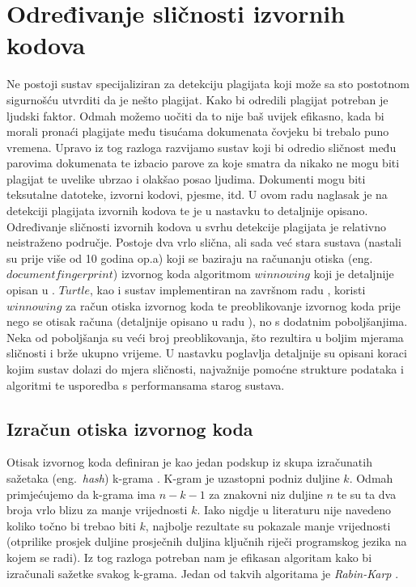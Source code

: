 \chapter{Određivanje sličnosti izvornih kodova}

Ne postoji sustav specijaliziran za detekciju plagijata koji može sa sto postotnom sigurnošću utvrditi da je nešto plagijat. Kako bi odredili plagijat potreban je ljudski faktor.  Odmah možemo uočiti da to nije baš uvijek efikasno, kada bi morali pronaći plagijate među tisućama dokumenata čovjeku bi trebalo puno vremena. Upravo iz tog razloga razvijamo sustav koji bi odredio sličnost među parovima dokumenata te izbacio parove za koje smatra da nikako ne mogu biti plagijat te uvelike ubrzao i olakšao posao ljudima. Dokumenti mogu biti teksutalne datoteke, izvorni kodovi, pjesme, itd. U ovom radu naglasak je na detekciji plagijata izvornih kodova te je u nastavku to detaljnije opisano. \\
	
	Određivanje sličnosti izvornih kodova u svrhu detekcije plagijata je relativno neistraženo područje. Postoje dva vrlo slična, ali sada već stara sustava (nastali su prije više od 10 godina op.a)  \cite{moss} \cite{jplag} koji se baziraju na računanju otiska (eng.~$document fingerprint$) izvornog koda algoritmom $winnowing$ koji je detaljnije opisan u \cite{winnowing}. $Turtle$, kao i sustav implementiran na završnom radu \cite{plagijator}, koristi $winnowing$ za račun otiska izvornog koda te preoblikovanje izvornog koda prije nego se otisak računa (detaljnije opisano u radu \cite{dorian}), no s dodatnim poboljšanjima. Neka od poboljšanja su veći broj preoblikovanja, što rezultira u boljim mjerama sličnosti i brže ukupno vrijeme. U nastavku poglavlja detaljnije su opisani koraci kojim sustav dolazi do mjera sličnosti, najvažnije pomoćne strukture podataka i algoritmi te usporedba s performansama starog sustava.

\section{Izračun otiska izvornog koda}

Otisak izvornog koda definiran je kao jedan podskup iz skupa izračunatih sažetaka (eng.~\textit{hash}) k-grama \cite{winnowing}. K-gram je uzastopni podniz duljine $k$. Odmah primjećujemo da k-grama ima $n-k-1$ za znakovni niz duljine $n$ te su ta dva broja vrlo blizu za manje vrijednosti $k$. Iako nigdje u literaturu nije navedeno koliko točno bi trebao biti $k$, najbolje rezultate su pokazale manje vrijednosti (otprilike prosjek duljine prosječnih duljina ključnih riječi programskog jezika na kojem se radi).  Iz tog razloga potreban nam je efikasan algoritam kako bi izračunali sažetke svakog k-grama. Jedan od takvih algoritama je \textit{Rabin-Karp} \cite{rabin-karp}.

